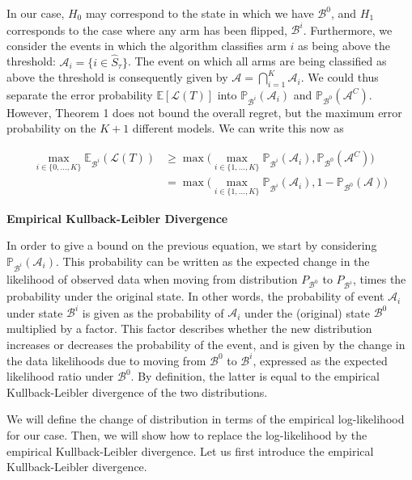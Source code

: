 \documentclass[11pt,]{article}
\begin{document}
In our case, \(H_0\) may correspond to the state in which we have
\(\mathcal{B}^0\), and \(H_1\) corresponds to the case where any arm has
been flipped, \(\mathcal{B}^i\). Furthermore, we consider the events in
which the algorithm classifies arm \(i\) as being above the threshold:
\(\mathcal{A}_i = \{i \in \hat{S}_\tau\}\). The event on which all arms
are being classified as above the threshold is consequently given by
\(\mathcal{A} = \bigcap_{i=1}^K \mathcal{A}_i\). We could thus separate
the error probability \(\mathbb{E}[\mathcal{L}(T)]\) into
\(\mathbb{P}_{\mathcal{B}^i}(\mathcal{A}_i)\) and
\(\mathbb{P}_{\mathcal{B}^0}(\mathcal{A}^C)\). However, Theorem 1 does
not bound the overall regret, but the maximum error probability on the
\(K+1\) different models. We can write this now as

\begin{align}
\max_{i \in \{0, \dots, K\}} \mathbb{E}_{\mathcal{B}^i} (\mathcal{L}(T)) & \geq \max \Big( \max_{i \in \{1, \dots, K\}} \mathbb{P}_{\mathcal{B}^i}(\mathcal{A}_i), \mathbb{P}_{\mathcal{B}^0}(\mathcal{A}^C) \Big) \\
& = \max \Big( \max_{i \in \{1, \dots, K\}} \mathbb{P}_{\mathcal{B}^i}(\mathcal{A}_i), 1 - \mathbb{P}_{\mathcal{B}^0}(\mathcal{A}) \Big) \label{LocatelliTheorem1ExpRegret}
\end{align}

\textbf{Empirical Kullback-Leibler Divergence}

In order to give a bound on the previous equation, we start by
considering \(\mathbb{P}_{\mathcal{B}^i}(\mathcal{A}_i)\). This
probability can be written as the expected change in the likelihood of
observed data when moving from distribution \(P_{\mathcal{B}^0}\) to
\(P_{\mathcal{B}^i}\), times the probability under the original state.
In other words, the probability of event \(\mathcal{A}_i\) under state
\(\mathcal{B}^i\) is given as the probability of \(\mathcal{A}_i\) under
the (original) state \(\mathcal{B}^0\) multiplied by a factor. This
factor describes whether the new distribution increases or decreases the
probability of the event, and is given by the change in the data
likelihoods due to moving from \(\mathcal{B}^0\) to \(\mathcal{B}^i\),
expressed as the expected likelihood ratio under \(\mathcal{B}^0\). By
definition, the latter is equal to the empirical Kullback-Leibler
divergence of the two distributions.

We will define the change of distribution in terms of the empirical
log-likelihood for our case. Then, we will show how to replace the
log-likelihood by the empirical Kullback-Leibler divergence. Let us
first introduce the empirical Kullback-Leibler divergence.
\end{document}
